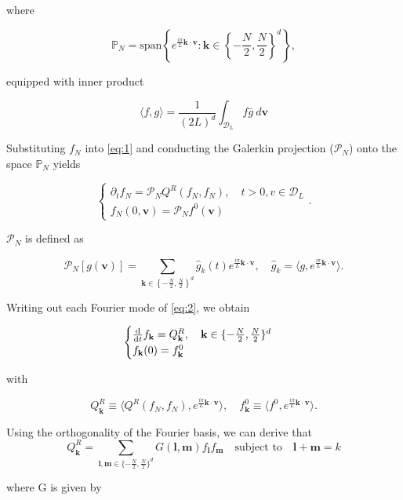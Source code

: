 \documentclass{article}
\def\t{\text}
\def\b{\mathbf}
\begin{document}
where 

\[
    \mathbb{P}_N = \t{span} \left\{ e^{\frac{i \pi}{L} \b k \cdot \b v } : \b k \in \left\{-\frac{N}{2}, \frac{N}{2}\right\}^d \right\},
\]

equipped with inner product

\[
    \langle f,g \rangle = \frac{1}{(2L)^d} \int_{\mathcal{D}_L} f \bar{g} \: d \b v\]

Substituting $f_N$ into \ref{eq:1} and conducting the Galerkin projection ($\mathcal{P}_N$) onto the space $\mathbb{P}_N$ yields

\begin{equation} \label{eq:2}
    \begin{cases}
        \partial_t f_N = \mathcal{P}_N Q^R(f_N,f_N), \quad t > 0, v\in \mathcal{D}_L\\
        f_N(0,\b v) = \mathcal{P}_N f^0(\b v)
    \end{cases}.
\end{equation}

$\mathcal{P}_N$ is defined as

\[
    \mathcal{P}_N [g(\b v)] = \sum_{\b k \in \left\{-\frac{N}{2}, \frac{N}{2}\right\}^d} \hat{g}_k(t) e^{\frac{i \pi}{L} \b k \cdot \b v }, \quad \hat{g}_k = \langle g, e^{\frac{i \pi}{L} \b k \cdot \b v } \rangle.
\]

Writing out each Fourier mode of \ref{eq:2}, we obtain

\begin{equation}
    \begin{cases}
        \frac{\t d}{\t d t} f_{\b k} = Q^R_{\b k}, \quad \mathbf{k} \in \{-\frac{N}{2}, \frac{N}{2}\}^d\\
        f_{\b k}(0) = f^0_{\mathbf{k}}
    \end{cases}
\end{equation}

with 

\[
    Q^R_{\b k} \equiv \langle Q^R(f_N, f_N), e^{\frac{i \pi}{L} \b k \cdot \b v } \rangle, \quad f^0_{\b k} \equiv \langle f^0, e^{\frac{i \pi}{L} \b k \cdot \b v} \rangle.
\]

Using the orthogonality of the Fourier basis, we can derive that
\begin{equation} \label{eq:QR}
    Q^R_{\b k} = \sum_{\b l,\b m \in \{-\frac{N}{2}, \frac{N}{2}\}^d} G(\b l,\b m) f_{\b l} f_{\b m} \quad \text{subject to} \quad \b l + \b m = k
\end{equation}

where G is given by
\end{document}
